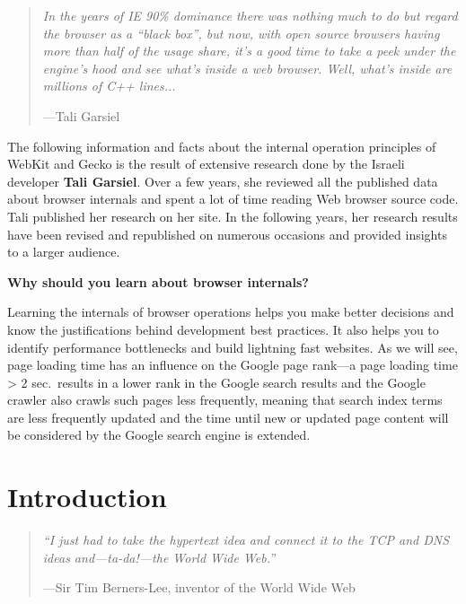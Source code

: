 \documentclass[a4paper, justified, notoc]{tufte-handout} %
\begin{document}
\begin{quote}
	\emph{In the years of IE 90\% dominance there was nothing much to do but regard the browser as a ``black box'', but now, with open source browsers having more than half of the usage share, it's a good time to take a peek under the engine's hood and see what's inside a web browser. Well, what's inside are millions of C++ lines...}\begin{flushright}\vspace{-1em}---Tali Garsiel \end{flushright}
\end{quote}

The following information and facts about the internal operation principles of WebKit and Gecko is the result of extensive research done by the Israeli developer \textbf{Tali Garsiel}. Over a few years, she reviewed all the published data about browser internals and spent a lot of time reading Web browser source code. Tali published her research on her site. In the following years, her research results have been revised and republished on numerous occasions and provided insights to a larger audience. 

\textbf{Why should you learn about browser internals?}

Learning the internals of browser operations helps you make better decisions and know the justifications behind development best practices. It also helps you to identify performance bottlenecks and build lightning fast websites. As we will see, page loading time has an influence on the Google page rank---a page loading time > 2 sec.\ results in a lower rank in the Google search results and the Google crawler also crawls such pages less frequently, meaning that  search index terms are less frequently updated and the time until new or updated page content will be considered by the Google search engine is extended.   










\section{Introduction}\label{sec:introduction}
\begin{quote}
	\emph{``I just had to take the hypertext idea and connect it to the TCP and DNS ideas and—ta-da!—the World Wide Web.''}\begin{flushright}\vspace{-1em}---Sir Tim Berners-Lee, inventor of the World Wide Web \end{flushright}
\end{quote}
\end{document}
